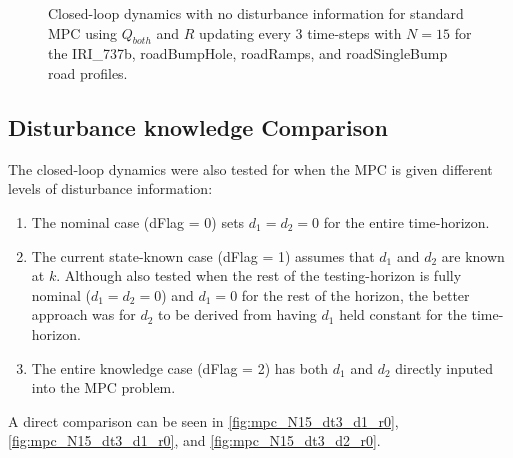\documentclass[onecolumn]{IEEEtran}
\begin{document}
\begin{figure}[!h]
    \caption{Closed-loop dynamics with no disturbance information for standard MPC using $Q_{both}$ and $R$ updating every 3 time-steps with $N=15$ for the IRI\_737b, roadBumpHole, roadRamps, and roadSingleBump road profiles.} \label{fig:mpc_N15_dt3_d0_r0}
\end{figure}

\newpage \clearpage
\subsection{Disturbance knowledge Comparison}
The closed-loop dynamics were also tested for when the MPC is given different levels of disturbance information:
\begin{enumerate}
    \item The nominal case (dFlag = 0) sets $d_1 = d_2 = 0$ for the entire time-horizon.
    \item The current state-known case (dFlag = 1) assumes that $d_1$ and $d_2$ are known at $k$. Although also tested when the rest of the testing-horizon is fully nominal ($d_1 = d_2 = 0$) and $d_1 = 0$ for the rest of the horizon, the better approach was for $d_2$ to be derived from having $d_1$ held constant for the time-horizon.
    \item The entire knowledge case (dFlag = 2) has both $d_1$ and $d_2$ directly inputed into the MPC problem.
\end{enumerate}

A direct comparison can be seen in \autoref{fig:mpc_N15_dt3_d1_r0},\autoref{fig:mpc_N15_dt3_d1_r0}, and \autoref{fig:mpc_N15_dt3_d2_r0}. 
\end{document}
